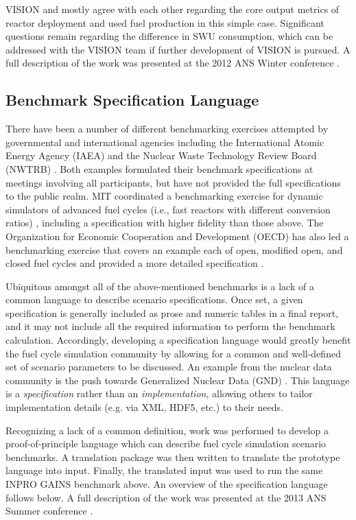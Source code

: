 VISION and \Cyclus mostly agree with each other regarding the core output
metrics of reactor deployment and used fuel production in this simple
case. Significant questions remain regarding the difference in SWU consumption,
which can be addressed with the VISION team if further development of VISION is
pursued. A full description of the work was presented at the 2012
ANS Winter conference \cite{gidden_once-through_2012}.

\subsection{Benchmark Specification Language}

There have been a number of different benchmarking exercises attempted by
governmental and international agencies including the International Atomic
Energy Agency (IAEA) \cite{_international_2011} and the Nuclear Waste Technology
Review Board (NWTRB) \cite{_nuclear_2011}.  Both examples formulated their
benchmark specifications at meetings involving all participants, but have not
provided the full specifications to the public realm. MIT coordinated a
benchmarking exercise for dynamic simulators of advanced fuel cycles (i.e., fast
reactors with different conversion ratios) \cite{guerin_benchmark_2009},
including a specification with higher fidelity than those above. The
Organization for Economic Cooperation and Development (OECD) has also led a
benchmarking exercise that covers an example each of open, modified open, and
closed fuel cycles \cite{boucher_benchmark_2012} and provided a more detailed
specification \cite{boucher_specification_2008}.

Ubiquitous amongst all of the above-mentioned benchmarks is a lack of a common
language to describe scenario specifications. Once set, a given specification is
generally included as prose and numeric tables in a final report, and it may not
include all the required information to perform the benchmark
calculation. Accordingly, developing a specification language would greatly
benefit the fuel cycle simulation community by allowing for a common and
well-defined set of scenario parameters to be discussed. An example from the
nuclear data community is the push towards Generalized Nuclear Data (GND)
\cite{mattoon_generalized_2012}. This language is a \emph{specification} rather
than an \emph{implementation}, allowing others to tailor implementation details
(e.g. via XML, HDF5, etc.) to their needs.

Recognizing a lack of a common definition, work was performed to develop a
proof-of-principle language which can describe fuel cycle simulation scenario
benchmarks. A translation package was then written to translate the prototype
language into \Cyclus input. Finally, the translated \Cyclus input was used to
run the same INPRO GAINS benchmark above. An overview of the specification
language follows below. A full description of the work was presented at the 2013
ANS Summer conference \cite{gidden_developing_2013}.

